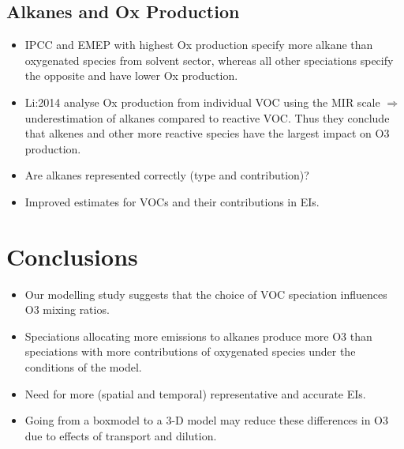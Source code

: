 \documentclass[14pt]{extarticle}
\begin{document}
\subsection{Alkanes and Ox Production}
\begin{itemize}
    \item IPCC and EMEP with highest Ox production specify more alkane than oxygenated species from solvent sector, whereas all other speciations specify the opposite and have lower Ox production.
    \item Li:2014 analyse Ox production from individual VOC using the MIR scale $\Rightarrow$ underestimation of alkanes compared to reactive VOC. Thus they conclude that alkenes and other more reactive species have the largest impact on O3 production.
	\item Are alkanes represented correctly (type and contribution)?
    \item Improved estimates for VOCs and their contributions in EIs.
\end{itemize} 

\section{Conclusions}
\begin{itemize}
	\item Our modelling study suggests that the choice of VOC speciation influences O3 mixing ratios.
    \item Speciations allocating more emissions to alkanes produce more O3 than speciations with more contributions of oxygenated species under the conditions of the model.
	\item Need for more (spatial and temporal) representative and accurate EIs.
	\item Going from a boxmodel to a 3-D model may reduce these differences in O3 due to effects of transport and dilution.
\end{itemize}
\end{document}
